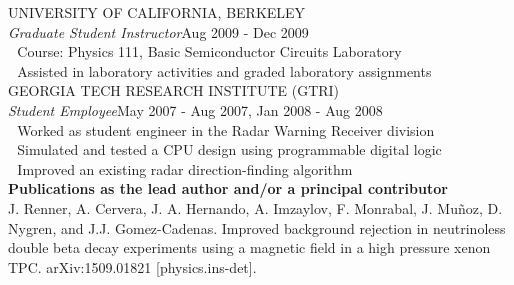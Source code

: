 \indent\hspace{0.2 cm}UNIVERSITY OF CALIFORNIA, BERKELEY\\
\indent\hspace{0.2 cm}\hspace{0.6 cm}\emph{Graduate Student Instructor}\hspace{6.9 cm}Aug 2009 - Dec 2009\\
\indent\hspace{0.2 cm}\hspace{0.6 cm}\hspace{0.6 cm}\textbullet\,\, Course: Physics 111, Basic Semiconductor Circuits Laboratory\\
\indent\hspace{0.2 cm}\hspace{0.6 cm}\hspace{0.6 cm}\textbullet\,\, Assisted in laboratory activities and graded laboratory assignments\\

\indent\hspace{0.2 cm}GEORGIA TECH RESEARCH INSTITUTE (GTRI)\\
\indent\hspace{0.2 cm}\hspace{0.6 cm}\emph{Student Employee}\hspace{4.8 cm}May 2007 - Aug 2007, Jan 2008 - Aug 2008\\
\indent\hspace{0.2 cm}\hspace{0.6 cm}\hspace{0.6 cm}\textbullet\,\, Worked as student engineer in the Radar Warning Receiver division\\
\indent\hspace{0.2 cm}\hspace{0.6 cm}\hspace{0.6 cm}\textbullet\,\, Simulated and tested a CPU design using programmable digital logic\\
\indent\hspace{0.2 cm}\hspace{0.6 cm}\hspace{0.6 cm}\textbullet\,\, Improved an existing radar direction-finding algorithm\\

\noindent \textbf{Publications as the lead author and/or a principal contributor}\\

\noindent J. Renner, A. Cervera, J. A. Hernando, A. Imzaylov, F. Monrabal, J. Mu\~noz, D. Nygren, and J.J. Gomez-Cadenas.  Improved background rejection in neutrinoless double beta decay experiments using a magnetic field in a high pressure xenon TPC.  arXiv:1509.01821 [physics.ins-det].\\

